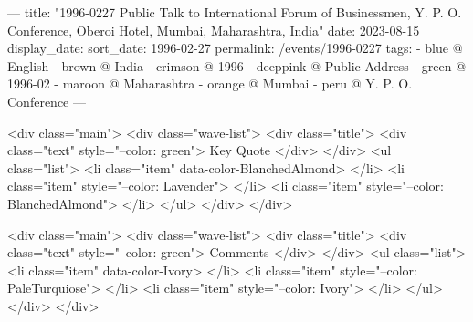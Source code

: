---
title: "1996-0227 Public Talk to International Forum of Businessmen, Y. P. O. Conference, Oberoi Hotel, Mumbai, Maharashtra, India"
date: 2023-08-15
display_date: 
sort_date: 1996-02-27
permalink: /events/1996-0227
tags:
  - blue @ English
  - brown @ India
  - crimson @ 1996
  - deeppink @ Public Address
  - green @ 1996-02
  - maroon @ Maharashtra
  - orange @ Mumbai
  - peru @ Y. P. O. Conference
---

<div class="main">
  <div class="wave-list">
    <div class="title">
      <div class="text" style="--color: green">
        Key Quote
      </div>
    </div>
    <ul class="list">
        <li class="item" data-color-BlanchedAlmond>
        </li>
        <li class="item" style="--color: Lavender">
        </li>
        <li class="item" style="--color: BlanchedAlmond">
        </li>
      </ul>
  </div>
</div>

<div class="main">
  <div class="wave-list">
    <div class="title">
      <div class="text" style="--color: green">
        Comments
      </div>
    </div>
    <ul class="list">
        <li class="item" data-color-Ivory>
        </li>
        <li class="item" style="--color: PaleTurquiose">
        </li>
        <li class="item" style="--color: Ivory">
        </li>
      </ul>
  </div>
</div>
